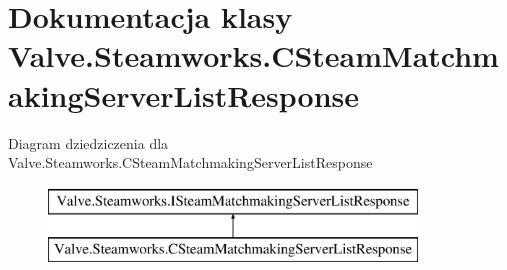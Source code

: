 \hypertarget{class_valve_1_1_steamworks_1_1_c_steam_matchmaking_server_list_response}{}\section{Dokumentacja klasy Valve.\+Steamworks.\+C\+Steam\+Matchmaking\+Server\+List\+Response}
\label{class_valve_1_1_steamworks_1_1_c_steam_matchmaking_server_list_response}
Diagram dziedziczenia dla Valve.\+Steamworks.\+C\+Steam\+Matchmaking\+Server\+List\+Response\begin{figure}[H]
\begin{center}
\leavevmode
\includegraphics[height=2.000000cm]{class_valve_1_1_steamworks_1_1_c_steam_matchmaking_server_list_response}
\end{center}
\end{figure}
